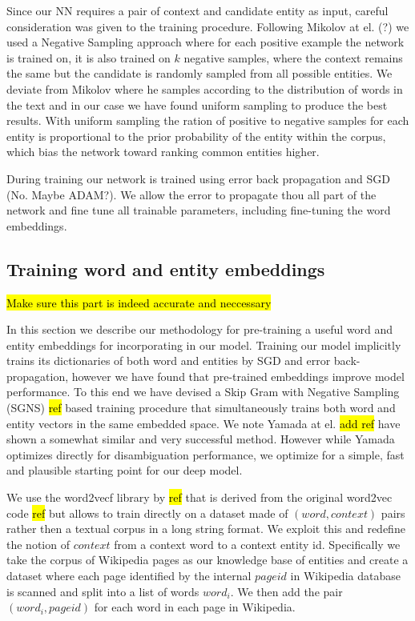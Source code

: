 \documentclass[11pt]{article}
\begin{document}
Since our NN requires a pair of context and candidate entity as input, careful consideration was given to the training procedure. Following Mikolov at el. (?) we used a Negative Sampling approach where for each positive example the network is trained on, it is also trained on $k$ negative samples, where the context remains the same but the candidate is randomly sampled from all possible entities. We deviate from Mikolov where he samples according to the distribution of words in the text and in our case we have found uniform sampling to produce the best results. With uniform sampling the ration of positive to negative samples for each entity is proportional to the prior probability of the entity within the corpus, which bias the network toward ranking common entities higher.

During training our network is trained using error back propagation and SGD (No. Maybe ADAM?). We allow the error to propagate thou all part of the network and fine tune all trainable parameters, including fine-tuning the word embeddings.

\subsection{Training word and entity embeddings}
\hl{Make sure this part is indeed accurate and neccessary}

In this section we describe our methodology for pre-training a useful word and entity embeddings for incorporating in our model. Training our model implicitly trains its dictionaries of both word and entities by SGD and error back-propagation, however we have found that pre-trained embeddings improve model performance. To this end we have devised a Skip Gram with Negative Sampling (SGNS) \hl{ref} based training procedure that simultaneously trains both word and entity vectors in the same embedded space. We note Yamada at el. \hl{add ref} have shown a somewhat similar and very successful method. However while Yamada optimizes directly for disambiguation performance, we optimize for a simple, fast and plausible starting point for our deep model.

We use the word2vecf library by \hl{ref} that is derived from the original word2vec code \hl{ref} but allows to train directly on a dataset made of $(word,context)$ pairs rather then a textual corpus in a long string format. We exploit this and redefine the notion of $context$ from a context word to a context entity id. Specifically we take the corpus of Wikipedia pages as our knowledge base of entities and create a dataset where each page identified by the internal $pageid$ in Wikipedia database is scanned and split into a list of words ${word_i}$. We then add the pair $(word_i,pageid)$ for each word in each page in Wikipedia.
\end{document}
